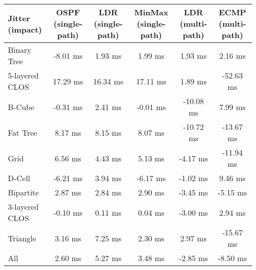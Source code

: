\begin{tabular}{l|ccccc}
Jitter (impact) & OSPF (single-path) & LDR (single-path) & MinMax (single-path) & LDR (multi-path) & ECMP (multi-path) \\
\hline
Binary Tree     & -8.01 ms           & 1.93 ms           & 1.99 ms              & 1.93 ms          & 2.16 ms           \\
5-layered CLOS  & 17.29 ms           & 16.34 ms          & 17.11 ms             & 1.89 ms          & -52.63 ms         \\
B-Cube          & -0.31 ms           & 2.41 ms           & -0.01 ms             & -10.08 ms        & 7.99 ms           \\
Fat Tree        & 8.17 ms            & 8.15 ms           & 8.07 ms              & -10.72 ms        & -13.67 ms         \\
Grid            & 6.56 ms            & 4.43 ms           & 5.13 ms              & -4.17 ms         & -11.94 ms         \\
D-Cell          & -6.21 ms           & 3.94 ms           & -6.17 ms             & -1.02 ms         & 9.46 ms           \\
Bipartite       & 2.87 ms            & 2.84 ms           & 2.90 ms              & -3.45 ms         & -5.15 ms          \\
3-layered CLOS  & -0.10 ms           & 0.11 ms           & 0.04 ms              & -3.00 ms         & 2.94 ms           \\
Triangle        & 3.16 ms            & 7.25 ms           & 2.30 ms              & 2.97 ms          & -15.67 ms         \\
All             & 2.60 ms            & 5.27 ms           & 3.48 ms              & -2.85 ms         & -8.50 ms          \\
\end{tabular}